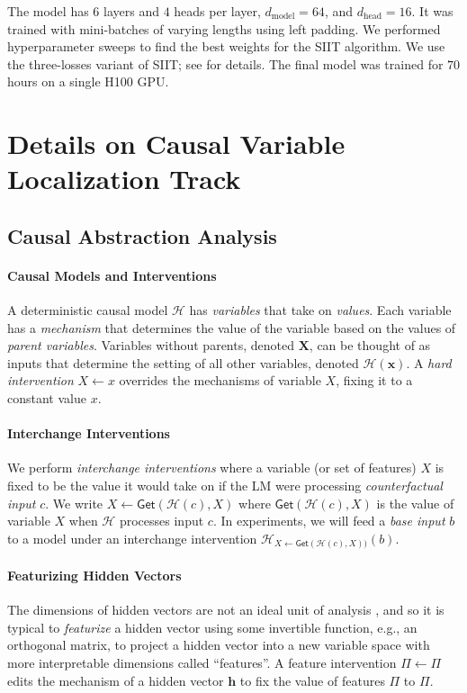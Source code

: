\documentclass{article}
\theoremstyle{plain}
\theoremstyle{definition}
\theoremstyle{remark}
\begin{document}
The model has $6$ layers and $4$ heads per layer, $d_{\text{model}} = 64$, and $d_{\text{head}} = 16$. It was trained with mini-batches of varying lengths using left padding. We performed hyperparameter sweeps to find the best weights for the SIIT algorithm. We use the three-losses variant of SIIT; see \citet{gupta2024interpbench} for details. The final model was trained for $70$ hours on a single H100 GPU.

\newpage
\section{Details on Causal Variable Localization Track} \label{app:causal_variable_track_details}



\subsection{Causal Abstraction Analysis}
\paragraph{Causal Models and Interventions}
A deterministic causal model $\mathcal{H}$ has \textit{variables} that take on \textit{values}. Each variable has a \textit{mechanism} that determines the value of the variable based on the values of \textit{parent variables}. Variables without parents, denoted $\mathbf{X}$, can be thought of as inputs that determine the setting of all other variables, denoted $\mathcal{H}(\mathbf{x})$. A \textit{hard intervention} $X \leftarrow x$ overrides the mechanisms of variable $X$, fixing it to a constant value $x$.  

\paragraph{Interchange Interventions} 
We perform \textit{interchange interventions} \citep{vig2020, geiger-etal-2020-neural} where a variable (or set of features) $X$ is fixed to be the value it would take on if the LM were processing \textit{counterfactual input} $c$. We write $X \leftarrow \mathsf{Get}(\mathcal{H}(c), X)$
where $\mathsf{Get}(\mathcal{H}(c), X)$ is the value of variable $X$ when $\mathcal{H}$ processes input $c$.
In experiments, we will feed a \textit{base input} $b$ to a model under an interchange intervention $\mathcal{H}_{X \leftarrow \mathsf{Get}(\mathcal{H}(c), X))}(b)$. 

\paragraph{Featurizing Hidden Vectors}
The dimensions of hidden vectors are not an ideal unit of analysis \citep{Smolensky1988a}, and so it is typical to \textit{featurize} a hidden vector using some invertible function, e.g., an orthogonal matrix, to project a hidden vector into a new variable space with more interpretable dimensions called ``features''\citep{geiger2024causalabstractiontheoreticalfoundation, huang-etal-2024-ravel}. 
A feature intervention $\Pi \leftarrow \Pi$ edits the mechanism of a hidden vector $\mathbf{h}$ to fix the value of features $\Pi$ to $\Pi$.
\end{document}
